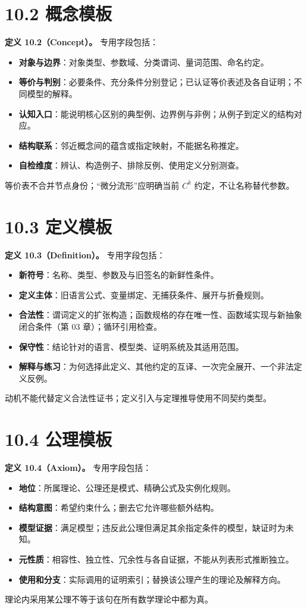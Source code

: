 \documentclass[UTF8,a4paper,zihao=-4,fontset=windows,openany]{ctexbook}
\begin{document}
\section{10.2 概念模板}
\textbf{定义 10.2（Concept）。} 专用字段包括：

\begin{itemize}
\item \textbf{对象与边界}：对象类型、参数域、分类谓词、量词范围、命名约定。
\item \textbf{等价与判别}：必要条件、充分条件分别登记；已认证等价表述及各自证明；不同模型的解释。
\item \textbf{认知入口}：能说明核心区别的典型例、边界例与非例；从例子到定义的结构对应。
\item \textbf{结构联系}：邻近概念间的蕴含或指定映射，不能据名称推定。
\item \textbf{自检维度}：辨认、构造例子、排除反例、使用定义分别测查。
\end{itemize}
等价表不合并节点身份；“微分流形”应明确当前 \(C^k\) 约定，不让名称替代参数。

\section{10.3 定义模板}
\textbf{定义 10.3（Definition）。} 专用字段包括：

\begin{itemize}
\item \textbf{新符号}：名称、类型、参数及与旧签名的新鲜性条件。
\item \textbf{定义主体}：旧语言公式、变量绑定、无捕获条件、展开与折叠规则。
\item \textbf{合法性}：谓词定义的扩张构造；函数规格的存在唯一性、函数域实现与新抽象闭合条件（第 03 章）；循环引用检查。
\item \textbf{保守性}：结论针对的语言、模型类、证明系统及其适用范围。
\item \textbf{解释与练习}：为何选择此定义、其他约定的互译、一次完全展开、一个非法定义反例。
\end{itemize}
动机不能代替定义合法性证书；定义引入与定理推导使用不同契约类型。

\section{10.4 公理模板}
\textbf{定义 10.4（Axiom）。} 专用字段包括：

\begin{itemize}
\item \textbf{地位}：所属理论、公理还是模式、精确公式及实例化规则。
\item \textbf{结构意图}：希望约束什么；删去它允许哪些额外结构。
\item \textbf{模型证据}：满足模型；违反此公理但满足其余指定条件的模型，缺证时为未知。
\item \textbf{元性质}：相容性、独立性、冗余性与各自证据，不能从列表形式推断独立。
\item \textbf{使用和分支}：实际调用的证明索引；替换该公理产生的理论及解释方向。
\end{itemize}
理论内采用某公理不等于该句在所有数学理论中都为真。
\end{document}
